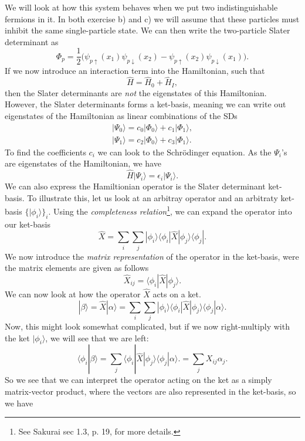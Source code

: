 \documentclass[a4paper, 11pt, notitlepage, english]{article}
\newcommand{\bra}[1]{\langle #1|}
\newcommand{\ket}[1]{|#1 \rangle}
\newcommand{\braket}[2]{\langle #1 | #2 \rangle}
\newcommand{\op}[1]{\hat{#1}}
\newcommand{\braopket}[3]{\langle #1 | {#2} | #3 \rangle}
\newcommand{\eps}{\epsilon}
\begin{document}
We will look at how this system behaves when we put two indistinguishable fermions in it. In both exercise b) and c) we will assume that these particles must inhibit the same single-particle state. We can then write the two-particle Slater determinant as
$$\Phi_p = \frac{1}{2}\bigg(\psi_{p\uparrow}(x_1)\psi_{p\downarrow}(x_2) - \psi_{p\uparrow}(x_2)\psi_{p\downarrow}(x_1)\bigg).$$ 
If we now introduce an interaction term into the Hamiltonian, such that
$$\op{H} = \op{H}_0 + \op{H}_I,$$
then the Slater determinants are \emph{not} the eigenstates of this Hamiltonian. However, the Slater determinants forms a ket-basis, meaning we can write out eigenstates of the Hamiltonian as linear combinations of the SDs
\begin{align*}
\ket{\Psi_0} = c_{0}\ket{\Phi_0} + c_{1}\ket{\Phi_1}, \\
\ket{\Psi_1} = c_{2}\ket{\Phi_0} + c_{3}\ket{\Phi_1}.
\end{align*}
To find the coefficients $c_{i}$ we can look to the Schrödinger equation. As the $\Psi_i$'s are eigenstates of the Hamiltonian, we have
$$\op{H}\ket{\Psi_i} = \eps_i\ket{\Psi_i}.$$ 
We can also express the Hamiltionian operator is the Slater determinant ket-basis. To illustrate this, let us look at an arbitray operator and an arbitraty ket-basis $\{\ket{\phi_i}\}_i$. Using the \emph{completeness relation}\footnote{See Sakurai sec 1.3, p. 19, for more details.}, we can expand the operator into our ket-basis
$$\op{X} = \sum_i \sum_j \ket{\phi_i}\braopket{\phi_i}{\op{X}}{\phi_j}\bra{\phi_j}.$$
We now introduce the \emph{matrix representation} of the operator in the ket-basis, were the matrix elements are given as follows
$$\op{X}_{ij} = \braopket{\phi_i}{\op{X}}{\phi_j}.$$
We can now look at how the operator $\op{X}$ acts on a ket.
$$\ket{\beta} = \op{X} \ket{\alpha} = \sum_i \sum_j \ket{\phi_i}\braopket{\phi_i}{\op{X}}{\phi_j}\braket{\phi_j}{\alpha}.$$
Now, this might look somewhat complicated, but if we now right-multiply with the ket $\ket{\phi_i}$, we will see that we are left:
$$\braket{\phi_i}{\beta} = \sum_j \braopket{\phi_i}{\op{X}}{\phi_j}\braket{\phi_j}{\alpha}. = \sum_j X_{ij} \alpha_j.$$
So we see that we can interpret the operator acting on the ket as a simply matrix-vector product, where the vectors are also represented in the ket-basis, so we have
\end{document}
